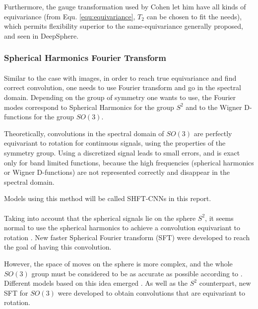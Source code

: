 \documentclass[11pt]{report}
\begin{document}
Furthermore, the gauge transformation used by Cohen let him have all kinds of equivariance (from Equ. \ref{equ:equivariance}, $T_2$ can be chosen to fit the needs), which permits flexibility superior to the same-equivariance generally proposed, and seen in DeepSphere.
    
\subsubsection*{Spherical Harmonics Fourier Transform}\label{sec:SHSCNN}
\paragraph*{}
Similar to the case with images, in order to reach true equivariance and find correct convolution, one needs to use Fourier transform and go in the spectral domain. Depending on the group of symmetry one wants to use, the Fourier modes correspond to Spherical Harmonics for the group $S^2$ and to the Wigner D-functions for the group $SO(3)$. 

Theoretically, convolutions in the spectral domain of $SO(3)$ are perfectly equivariant to rotation for continuous signals, using the properties of the symmetry group. 
Using a discretized signal leads to small errors, and is exact only for band limited functions, because the high frequencies (spherical harmonics or Wigner D-functions) are not represented correctly and disappear in the spectral domain.

Models using this method will be called SHFT-CNNs in this report.

\paragraph*{}
Taking into account that the spherical signals lie on the sphere $S^2$, it seems normal to use the spherical harmonics to achieve a convolution equivariant to rotation \cite{esteves_learning_2017}. 
New faster Spherical Fourier transform (SFT) were developed to reach the goal of having this convolution.

However, the space of moves on the sphere is more complex, and the whole $SO(3)$ group must be considered to be as accurate as possible according to \cite{cohen_spherical_2018}. Different models based on this idea emerged \cite{kondor_clebsch_2018, feng_discriminative_2018}. As well as the $S^2$ counterpart, new SFT for $SO(3)$ were developed to obtain convolutions that are equivariant to rotation.
\end{document}
